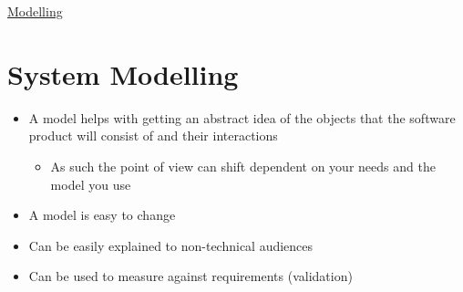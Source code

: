 \documentclass{article}[18pt]
\begin{document}
\begin{center}
\underline{\huge Modelling}
\end{center}
\section{System Modelling}
\begin{itemize}
	\item A model helps with getting an abstract idea of the objects that the software product will consist of and their interactions
	\begin{itemize}
		\item As such the point of view can shift dependent on your needs and the model you use
	\end{itemize}
	\item A model is easy to change
	\item Can be easily explained to non-technical audiences
	\item Can be used to measure against requirements (validation)
\end{itemize}
\end{document}
